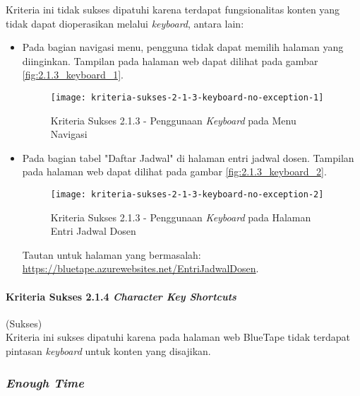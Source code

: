 Kriteria ini tidak sukses dipatuhi karena terdapat fungsionalitas konten yang tidak dapat dioperasikan melalui \textit{keyboard}, antara lain:

\begin{itemize}
    \item Pada bagian navigasi menu, pengguna tidak dapat memilih halaman yang diinginkan. Tampilan pada halaman web dapat dilihat pada gambar \ref{fig:2.1.3_keyboard_1}.
    \begin{figure}[H]
        \centering  
        \texttt{[image: kriteria-sukses-2-1-3-keyboard-no-exception-1]}  
        \caption[Kriteria Sukses 2.1.3 - Penggunaan \textit{Keyboard} pada Menu Navigasi]{Kriteria Sukses 2.1.3 - Penggunaan \textit{Keyboard} pada Menu Navigasi}
        \label{fig:2.1.3_keyboard_no_exception_1}  
    \end{figure} 

    \item Pada bagian tabel "Daftar Jadwal" di halaman entri jadwal dosen. Tampilan pada halaman web dapat dilihat pada gambar \ref{fig:2.1.3_keyboard_2}.
    \begin{figure}[H]
        \centering  
        \texttt{[image: kriteria-sukses-2-1-3-keyboard-no-exception-2]}  
        \caption[Kriteria Sukses 2.1.3 - Penggunaan \textit{Keyboard} pada Halaman Entri Jadwal Dosen]{Kriteria Sukses 2.1.3 - Penggunaan \textit{Keyboard} pada Halaman Entri Jadwal Dosen}
        \label{fig:2.1.3_keyboard_no_exception_2}  
    \end{figure} 
    Tautan untuk halaman yang bermasalah: \url{https://bluetape.azurewebsites.net/EntriJadwalDosen}.
\end{itemize}

\paragraph{Kriteria Sukses 2.1.4 \textit{Character Key Shortcuts}}
\label{par:kepatuhan_bluetape_kriteria_sukses_2.1.4}
(Sukses)\\

Kriteria ini sukses dipatuhi karena pada halaman web BlueTape tidak terdapat pintasan \textit{keyboard} untuk konten yang disajikan.

\subsubsection{\textit{Enough Time}}
\label{subsubsec:kepatuhan_bluetape_enough_time}

